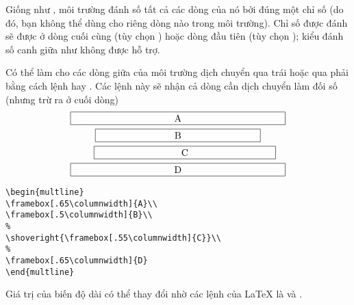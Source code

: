 \medskip
Giống như , môi trường  đánh số tất cả
các dòng của nó bởi đúng một chỉ số (do đó, bạn không thể dùng 
cho riêng dòng nào trong môi trường). Chỉ số được đánh sẽ được ở dòng
cuối cùng (tùy chọn ) hoặc dòng đầu tiên (tùy chọn );
kiểu đánh số canh giữa như  không được hỗ trợ.

\medskip
Có thể làm cho các dòng giữa của môi trường dịch chuyển qua trái hoặc
qua phải bằng cách lệnh  hay .
Các lệnh này sẽ nhận cả dòng cần dịch chuyển làm đối số
(nhưng trừ ra \cn{\\} ở cuối dòng)
\begin{multline}
\framebox[.65\columnwidth]{A}\\
\framebox[.5\columnwidth]{B}\\
\shoveright{\framebox[.55\columnwidth]{C}}\\
\framebox[.65\columnwidth]{D}
\end{multline}
\begin{verbatim}
\begin{multline}
\framebox[.65\columnwidth]{A}\\
\framebox[.5\columnwidth]{B}\\
%
\shoveright{\framebox[.55\columnwidth]{C}}\\
%
\framebox[.65\columnwidth]{D}
\end{multline}
\end{verbatim}

Giá trị của biến độ dài  có thể thay đổi nhờ các
lệnh của \LaTeX{} là  và .


